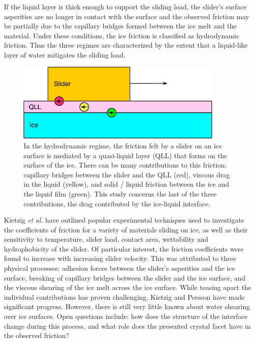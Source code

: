 If the liquid layer is thick enough to support the sliding load, the
slider's surface asperities are no longer in contact with the surface
and the observed friction may be partially due to the capillary
bridges formed between the ice melt and the material. Under these
conditions, the ice friction is classified as hydrodynamic
friction.\cite{Kietzig2009,Kietzig2010} Thus the three regimes are
characterized by the extent that a liquid-like layer of water
mitigates the sliding load.

\begin{figure}
\includegraphics[width=4in]{Figures/QLLsketch}
\caption{\label{fig:QLLsketch} In the hydrodynamic regime, the
  friction felt by a slider on an ice surface is mediated by a
  quasi-liquid layer (QLL) that forms on the surface of the ice.
  There can be many contributions to this friction: capillary bridges
  between the slider and the QLL (red), viscous drag in the liquid
  (yellow), and solid / liquid friction between the ice and the liquid
  film (green). This study concerns the last of the three
  contributions, the drag contributed by the ice-liquid interface.}
\end{figure}

Kietzig \textit{et al.} have outlined popular experimental techniques
used to investigate the coefficients of friction for a variety of
materials sliding on ice, as well as their sensitivity to temperature,
slider load, contact area, wettability and hydrophobicity of the
slider.\cite{Kietzig2010} Of particular interest, the friction
coefficients were found to increase with increasing slider
velocity. This was attributed to three physical processes; adhesion
forces between the slider's asperities and the ice surface, breaking
of capillary bridges between the slider and the ice surface, and the
viscous shearing of the ice melt across the ice surface. While teasing
apart the individual contributions has proven challenging,
Kietzig\cite{Kietzig2009} and Persson\cite{Persson2015,Tuononen2016}
have made significant progress. However, there is still very little
known about water shearing over ice surfaces. Open questions include:
how does the structure of the interface change during this process,
and what role does the presented crystal facet have in the observed
friction?

